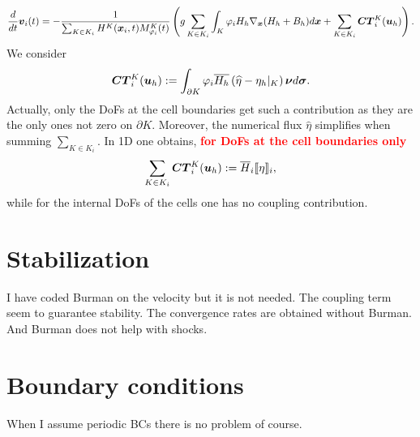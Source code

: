 \documentclass[english]{article}
\theoremstyle{thmstyleone}
\theoremstyle{thmstyletwo}
\theoremstyle{thmstylethree}
\newcommand{\uapp}[0]{\uvec{u}_h}
\newcommand{\uvec}[2][3]{\boldsymbol{#2\mkern-#1mu}\mkern#1mu}
\begin{document}
\begin{equation}
	\frac{d}{dt}\uvec{v}_i(t)=-\frac{1}{\sum_{K \in K_i} H^K(\uvec{x}_i,t) M^K_{\varphi_i}(t)}\left(g \sum_{K \in K_i} \int_K \varphi_i H_h\nabla_{\uvec{x}}(H_h+B_h)  d\uvec{x} + \sum_{K \in K_i}\uvec{CT}^K_i(\uvec{u}_h) \right).
\end{equation}
We consider
\begin{align}
\begin{split}
\uvec{CT}^K_i(\uvec{u}_h):=\int_{\partial K} \varphi_i \overline{H_h} \left( \widehat{\eta}-\eta_h\vert_K \right) \uvec{\nu} d \uvec{\sigma}.
\end{split}
\label{eq:CT}
\end{align}
Actually, only the DoFs at the cell boundaries get such a contribution as they are the only ones not zero on $\partial K$. Moreover, the numerical flux $\widehat{\eta}$ simplifies when summing $\sum_{K \in K_i}$. In 1D one obtains, \textcolor{red}{\textbf{for DoFs at the cell boundaries only}}
\begin{align}
	\begin{split}
		\sum_{K \in K_i}\uvec{CT}^K_i(\uvec{u}_h) := \overline{H}_i \llbracket \eta \rrbracket_i,
	\end{split}
	\label{eq:CT1D}
\end{align}
while for the  internal DoFs of the cells one has no coupling contribution.




\section{Stabilization}

I have coded Burman on the velocity but it is not needed.
The coupling term seem to guarantee stability.
The convergence rates are obtained without Burman.
And Burman does not help with shocks.


\section{Boundary conditions}
When I assume periodic BCs there is no problem of course.
\end{document}
